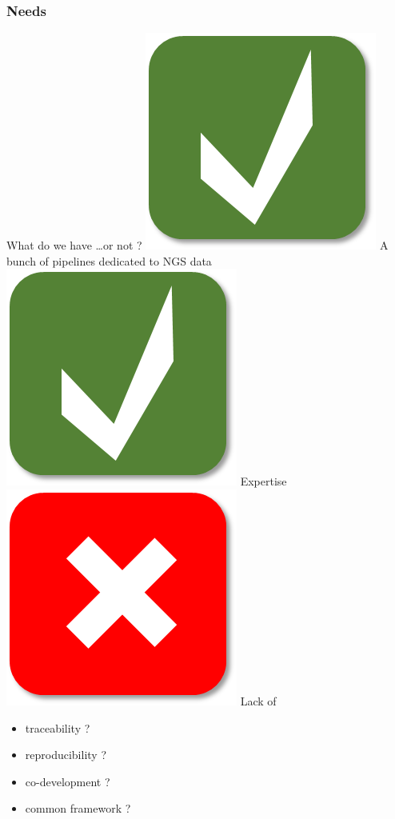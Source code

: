 \documentclass{beamer}
\begin{document}
\begin{frame}
 \frametitle{Needs}
 
    \begin{block}{What do we have \dots or not ?}
     \includegraphics[scale=0.05]{positive.png}\; A bunch of pipelines dedicated to NGS data\\
     \includegraphics[scale=0.05]{positive.png}\; Expertise\\
     \includegraphics[scale=0.05]{negative.png}\; Lack of \\
	\begin{itemize}
	 \item traceability ?
	 \item reproducibility ? 
	 \item co-development ? 
	 \item common framework ?
	\end{itemize}
    \end{block}
    

\end{frame}
\end{document}
